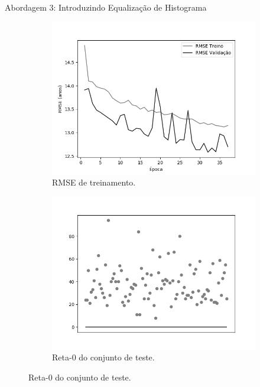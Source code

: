 \begin{frame}{Abordagem 3: Introduzindo Equalização de Histograma}
  \begin{figure}[h!]
    \caption{Resultados do treinamento e teste da CNN LeNet \emph{Leaky ReLU}.}
  \begin{subfigure}[hb]{0.4\textwidth}
    \caption{RMSE de treinamento.}
    \includegraphics[width=\linewidth]{img/graficos/history/lenet/fig-history-image-treat-3-lenet-lrelu-rmse.png}
  \end{subfigure}
  \begin{subfigure}[hb]{0.4\textwidth}
    \caption{Reta-0 do conjunto de teste.}
   \includegraphics[width=\linewidth]{img/graficos/reta0/lenet/fig-reta-0-image-treat-3-lenet-lrelu.png}
  \end{subfigure}%
\end{figure}
\end{frame}


